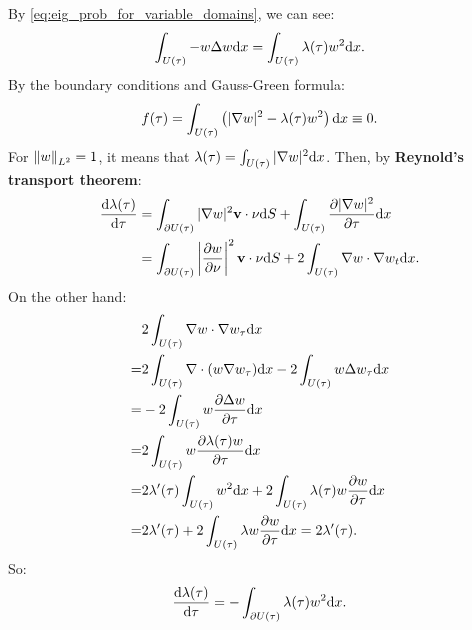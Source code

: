 \begin{solution}
    By \eqref{eq:eig_prob_for_variable_domains}, we can see:
    \begin{equation}
        \int_{U(\tau)}-w\Delta w\mathrm{d} x=\int_{U(\tau)}\lambda(\tau)w^{2}\mathrm{d} x.
    \end{equation}
    By the boundary conditions and Gauss-Green formula:
    \begin{equation}
        f(\tau)=\int_{U(\tau)}\left(|\nabla w|^{2}-\lambda(\tau)w^{2}\right)\mathrm{d} x\equiv 0.
    \end{equation}
    For $\left\|w\right\|_{L^{2}}=1$, it means that $\lambda(\tau)=\int_{U(\tau)}|\nabla w|^{2}\mathrm{d} x$. Then, by \textbf{Reynold's transport theorem}:
    \begin{equation}
        \begin{aligned}
            \frac{\mathrm{d} \lambda(\tau)}{\mathrm{d}\tau}&=\int_{\partial U(\tau)}|\nabla w|^{2}\mathbf{v}\cdot\nu\mathrm{d} S+\int_{U(\tau)}\frac{\partial |\nabla w|^{2}}{\partial \tau}\mathrm{d} x\\
            &=\int_{\partial U(\tau)}\left|\frac{\partial w}{\partial \nu}\right|^{2}\mathbf{v}\cdot\nu\mathrm{d} S+2\int_{U(\tau)}\nabla w\cdot\nabla w_{t}\mathrm{d} x.
        \end{aligned}
    \end{equation}
    On the other hand:
    \begin{equation}
        \begin{aligned}
            &2\int_{U(\tau)}\nabla w\cdot\nabla w_{\tau}\mathrm{d} x\\
            =&2\int_{U(\tau)}\nabla\cdot(w\nabla w_{\tau})\mathrm{d} x-2\int_{U(\tau)}w\Delta w_{\tau}\mathrm{d} x\\
            =&-2\int_{U(\tau)}w\frac{\partial \Delta w}{\partial \tau}\mathrm{d} x\\
            =&2\int_{U(\tau)}w\frac{\partial \lambda(\tau)w}{\partial \tau}\mathrm{d} x\\
            =&2\lambda'(\tau)\int_{U(\tau)}w^{2}\mathrm{d} x+2\int_{U(\tau)}\lambda(\tau)w\frac{\partial w}{\partial \tau}\mathrm{d} x\\
            =&2\lambda'(\tau)+2\int_{U(\tau)}\lambda w\frac{\partial w}{\partial \tau}\mathrm{d} x=2\lambda'(\tau).
        \end{aligned}
    \end{equation}
    So:
    \begin{equation}
        \frac{\mathrm{d} \lambda(\tau)}{\mathrm{d} \tau}=-\int_{\partial U(\tau)}\lambda(\tau)w^{2}\mathrm{d} x.
    \end{equation}
\end{solution}